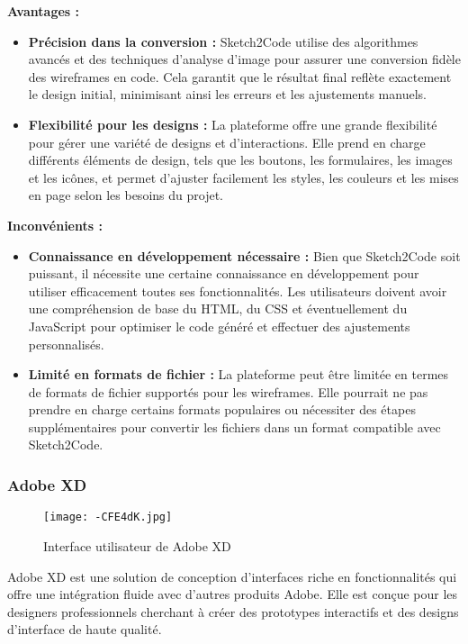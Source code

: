 \textbf{Avantages :}
\begin{itemize}
    \item \textbf{Précision dans la conversion :} Sketch2Code utilise des algorithmes avancés et des techniques d'analyse d'image pour assurer une conversion fidèle des wireframes en code. Cela garantit que le résultat final reflète exactement le design initial, minimisant ainsi les erreurs et les ajustements manuels.

    \item \textbf{Flexibilité pour les designs :} La plateforme offre une grande flexibilité pour gérer une variété de designs et d'interactions. Elle prend en charge différents éléments de design, tels que les boutons, les formulaires, les images et les icônes, et permet d'ajuster facilement les styles, les couleurs et les mises en page selon les besoins du projet.
\end{itemize}

\textbf{Inconvénients :}
\begin{itemize}
    \item \textbf{Connaissance en développement nécessaire :} Bien que Sketch2Code soit puissant, il nécessite une certaine connaissance en développement pour utiliser efficacement toutes ses fonctionnalités. Les utilisateurs doivent avoir une compréhension de base du HTML, du CSS et éventuellement du JavaScript pour optimiser le code généré et effectuer des ajustements personnalisés.

    \item \textbf{Limité en formats de fichier :} La plateforme peut être limitée en termes de formats de fichier supportés pour les wireframes. Elle pourrait ne pas prendre en charge certains formats populaires ou nécessiter des étapes supplémentaires pour convertir les fichiers dans un format compatible avec Sketch2Code.
\end{itemize}

\subsubsection{Adobe XD}
\begin{figure}[h]
    \centering
    \texttt{[image: -CFE4dK.jpg]}
    \caption{Interface utilisateur de Adobe XD}
    \label{fig:adobe_xd_interface}
\end{figure}
Adobe XD est une solution de conception d'interfaces riche en fonctionnalités qui offre une intégration fluide avec d'autres produits Adobe. Elle est conçue pour les designers professionnels cherchant à créer des prototypes interactifs et des designs d'interface de haute qualité.

